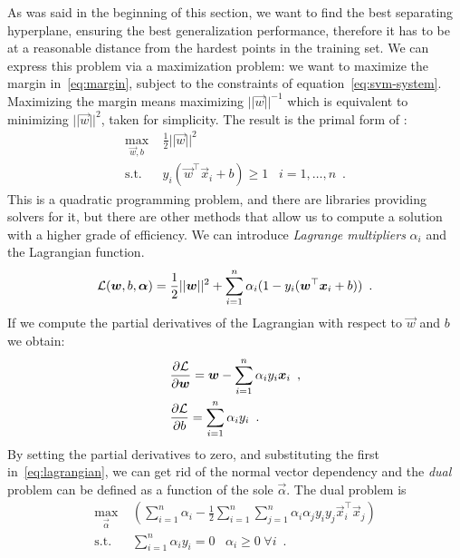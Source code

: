 As was said in the beginning of this section, we want to find the best separating hyperplane,
ensuring the best generalization performance, therefore it has to be at a reasonable distance from
the hardest points in the training set. We can express this problem via a maximization problem: we
want to maximize the margin in~\ref{eq:margin}, subject to the constraints of
equation~\ref{eq:svm-system}. Maximizing the margin means maximizing $||\vec{w}||^{-1}$ which is
equivalent to minimizing $||\vec{w}||^2$, taken for simplicity. The result is the primal form of
\svm:
\begin{equation}
	\label{eq:primal}
	\begin{aligned}
		\max_{\vec{w}, b}        & \frac{1}{2}||\vec{w}||^2                                            \\
		\text{s.t.}\hspace{10pt} & y_i(\vec{w}^\top\vec{x}_i + b) \geq 1 \hspace{10pt}i = 1,
		\ldots, n \enspace.
	\end{aligned}
\end{equation}
This is a quadratic programming problem, and there are libraries providing solvers for it, but there
are other methods that allow us to compute a solution with a higher grade of efficiency. We can
introduce \emph{Lagrange multipliers} $\alpha_i$ and the Lagrangian function.
\begin{equation}
	\label{eq:lagrangian}
	\mathcal{L}(\boldsymbol{w}, b, \boldsymbol{\alpha}) = \frac{1}{2} ||\boldsymbol{w}||^2 + \sum_{i = 1}^{n}{\alpha_i (1 -
	y_i(\boldsymbol{w}^\top\boldsymbol{x}_i + b))} \enspace.
\end{equation}
If we compute the partial derivatives of the Lagrangian with respect to $\vec{w}$ and $b$ we obtain:
\begin{equation}
	\label{eq:pd-lagrangian}
	\begin{aligned}
		 & \frac{\partial{\mathcal{L}}}{\partial{\boldsymbol{w}}} = \boldsymbol{w} - \sum_{i = 1}^n
		\alpha_iy_i\boldsymbol{x}_i \enspace,                                                  \\
		 & \frac{\partial{\mathcal{L}}}{\partial{b}} = \sum_{i = 1}^n \alpha_iy_i \enspace.
	\end{aligned}
\end{equation}
By setting the partial derivatives to zero, and substituting the first in~\ref{eq:lagrangian}, we
can get rid of the normal vector dependency and the \emph{dual} problem can be defined as a function
of the sole $\vec{\alpha}$. The dual problem is
\begin{equation}
	\label{eq:dual}
	\begin{aligned}
		\max_{\vec{\alpha}}       & \left(\sum_{i = 1}^n{\alpha_i} - \frac{1}{2}\sum_{i =
		1}^n\sum_{j = 1}^n{\alpha_i\alpha_j y_i y_j \vec{x}_i^\top\vec{x}_j}\right)               \\
		\text{s.t.} \hspace{10pt} & \sum_{i = 1}^n{\alpha_i y_i} = 0 \hspace{10pt}
		\alpha_i \geq 0 \hspace{3pt} \forall i \enspace.
	\end{aligned}
\end{equation}
